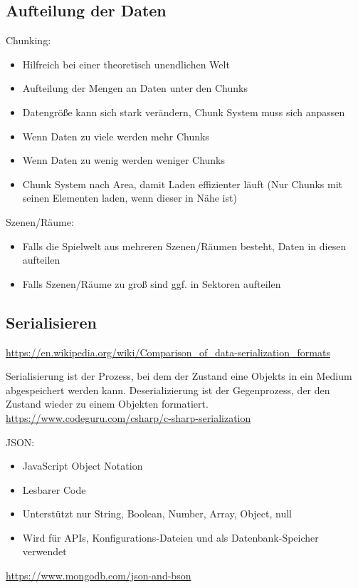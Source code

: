 \subsection{Aufteilung der Daten}
Chunking:
\begin{itemize}
    \item Hilfreich bei einer theoretisch unendlichen Welt
    \item Aufteilung der Mengen an Daten unter den Chunks
    \item Datengröße kann sich stark verändern, Chunk System muss sich anpassen
    \item Wenn Daten zu viele werden mehr Chunks
    \item Wenn Daten zu wenig werden weniger Chunks
    \item Chunk System nach Area, damit Laden effizienter läuft 
    (Nur Chunks mit seinen Elementen laden, wenn dieser in Nähe ist)
\end{itemize}

Szenen/Räume:
\begin{itemize}
    \item Falls die Spielwelt aus mehreren Szenen/Räumen besteht, Daten in diesen aufteilen
    \item Falls Szenen/Räume zu groß sind ggf. in Sektoren aufteilen
\end{itemize}


\subsection{Serialisieren}
\url{https://en.wikipedia.org/wiki/Comparison_of_data-serialization_formats}

Serialisierung ist der Prozess, bei dem der Zustand eine Objekts in ein Medium abgespeichert werden kann. Deserializierung ist der Gegenprozess, der den Zustand wieder zu einem Objekten formatiert. \url{https://www.codeguru.com/csharp/c-sharp-serialization}

JSON:
\begin{itemize}
    \item JavaScript Object Notation
    \item Lesbarer Code
    \item Unterstützt nur String, Boolean, Number, Array, Object, null
    \item Wird für APIs, Konfigurations-Dateien und als Datenbank-Speicher verwendet 
\end{itemize}
\url{https://www.mongodb.com/json-and-bson}

